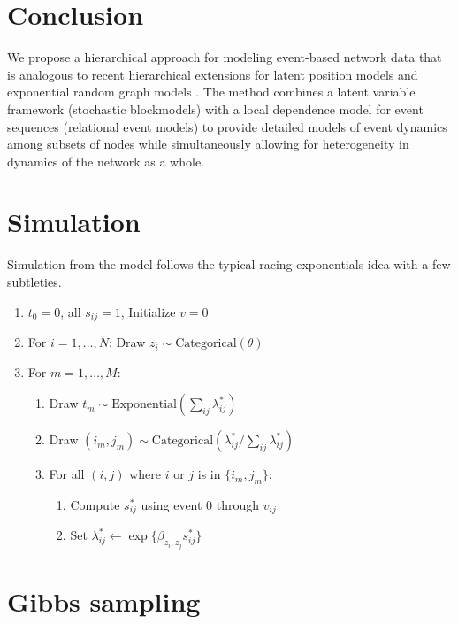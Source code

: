 \documentclass[11pt]{article}
\begin{document}
\section{Conclusion}
 We propose a hierarchical approach for modeling event-based network data that is analogous to recent hierarchical extensions for latent position models \cite{Handcock2007} and exponential random graph models \cite{Schweinberger2011}.  The method combines a latent variable framework (stochastic blockmodels) with a local dependence model for event sequences (relational event models) to provide detailed models of event dynamics among subsets of nodes while simultaneously allowing for heterogeneity in dynamics of the network as a whole.


\appendix
\section{Simulation}

Simulation from the model follows the typical racing exponentials idea with a few subtleties.

\begin{enumerate}
\item $t_0 = 0$, all $s_{ij} = 1$, Initialize $v = 0$
\item For $i = 1, \ldots, N$: Draw $z_i \sim \mbox{Categorical}(\theta)$
\item For $m = 1, \ldots, M$:
  \begin{enumerate}
  \item Draw $t_m \sim \mbox{Exponential}\left(\sum_{ij} \lambda_{ij}^*\right)$
  \item Draw $(i_m,j_m) \sim \mbox{Categorical}\left(\lambda_{ij}^* / \sum_{ij}\lambda_{ij}^*\right)$
  \item For all $(i,j)$ where $i$ or $j$ is in $\{i_m,j_m\}$:
    \begin{enumerate}
    \item Compute $s_{ij}^*$ using event $0$ through $v_{ij}$
    \item Set $\lambda_{ij}^* \leftarrow \exp\{ \beta_{z_i,z_j} s_{ij}^*\}$ 
    \end{enumerate}
  \end{enumerate}
\end{enumerate}

\section{Gibbs sampling}
\end{document}
